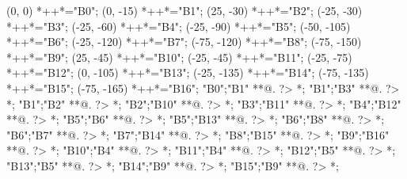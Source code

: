 \begin{scriptsize}
\xy(0, 0)
	*++{}*\frm{-,}="B0";
(0, -15)
	*++{}*\frm{-,}="B1";
(25, -30)
	*++{}*\frm{-,}="B2";
(-25, -30)
	*++{}*\frm{-,}="B3";
(-25, -60)
	*++{}*\frm{-,}="B4";
(-25, -90)
	*++{}*\frm{-,}="B5";
(-50, -105)
	*++{}*\frm{-,}="B6";
(-25, -120)
	*++{}*\frm{-,}="B7";
(-75, -120)
	*++{}*\frm{-,}="B8";
(-75, -150)
	*++{}*\frm{-,}="B9";
(25, -45)
	*++{}*\frm{-,}="B10";
(-25, -45)
	*++{}*\frm{-,}="B11";
(-25, -75)
	*++{}*\frm{-,}="B12";
(0, -105)
	*++{}*\frm{-,}="B13";
(-25, -135)
	*++{}*\frm{-,}="B14";
(-75, -135)
	*++{}*\frm{-,}="B15";
(-75, -165)
	*++{}*\frm{-,}="B16";
"B0";"B1" **@{.} ?> *{\dir{>}};
"B1";"B3" **@{.} ?> *{\dir{>}};
"B1";"B2" **@{.} ?> *{\dir{>}};
"B2";"B10" **@{.} ?> *{\dir{>}};
"B3";"B11" **@{.} ?> *{\dir{>}};
"B4";"B12" **@{.} ?> *{\dir{>}};
"B5";"B6" **@{.} ?> *{\dir{>}};
"B5";"B13" **@{.} ?> *{\dir{>}};
"B6";"B8" **@{.} ?> *{\dir{>}};
"B6";"B7" **@{.} ?> *{\dir{>}};
"B7";"B14" **@{.} ?> *{\dir{>}};
"B8";"B15" **@{.} ?> *{\dir{>}};
"B9";"B16" **@{.} ?> *{\dir{>}};
"B10";"B4" **@{.} ?> *{\dir{>}};
"B11";"B4" **@{.} ?> *{\dir{>}};
"B12";"B5" **@{.} ?> *{\dir{>}};
"B13";"B5" **@{.} ?> *{\dir{>}};
"B14";"B9" **@{.} ?> *{\dir{>}};
"B15";"B9" **@{.} ?> *{\dir{>}};
\endxy
\end{scriptsize}


